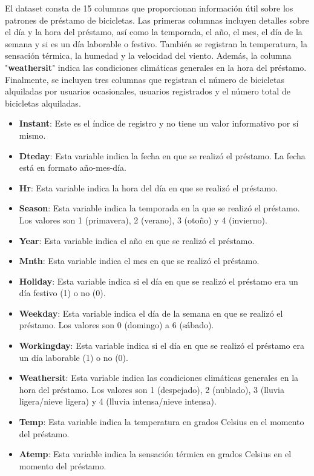 \documentclass{wsdcr}
\begin{document}
El dataset consta de 15 columnas que proporcionan información útil sobre los patrones de préstamo de bicicletas. Las primeras columnas incluyen detalles sobre el día y la hora del préstamo, así como la temporada, el año, el mes, el día de la semana y si es un día laborable o festivo. También se registran la temperatura, la sensación térmica, la humedad y la velocidad del viento. Además, la columna "\textbf{weathersit}" indica las condiciones climáticas generales en la hora del préstamo. Finalmente, se incluyen tres columnas que registran el número de bicicletas alquiladas por usuarios ocasionales, usuarios registrados y el número total de bicicletas alquiladas.
\begin{itemize}
    \item \textbf{Instant}: Este es el índice de registro y no tiene un valor informativo por sí mismo.
    \item \textbf{Dteday}: Esta variable indica la fecha en que se realizó el préstamo. La fecha está en formato año-mes-día.
    \item \textbf{Hr}: Esta variable indica la hora del día en que se realizó el préstamo.
    \item \textbf{Season}: Esta variable indica la temporada en la que se realizó el préstamo. Los valores son 1 (primavera), 2 (verano), 3 (otoño) y 4 (invierno).
    \item \textbf{Year}: Esta variable indica el año en que se realizó el préstamo.
    \item \textbf{Mnth}: Esta variable indica el mes en que se realizó el préstamo.
    \item \textbf{Holiday}: Esta variable indica si el día en que se realizó el préstamo era un día festivo (1) o no (0).
    \item \textbf{Weekday}: Esta variable indica el día de la semana en que se realizó el préstamo. Los valores son 0 (domingo) a 6 (sábado).
    \item \textbf{Workingday}: Esta variable indica si el día en que se realizó el préstamo era un día laborable (1) o no (0).
    \item \textbf{Weathersit}: Esta variable indica las condiciones climáticas generales en la hora del préstamo. Los valores son 1 (despejado), 2 (nublado), 3 (lluvia ligera/nieve ligera) y 4 (lluvia intensa/nieve intensa).
    \item \textbf{Temp}: Esta variable indica la temperatura en grados Celsius en el momento del préstamo.
    \item \textbf{Atemp}: Esta variable indica la sensación térmica en grados Celsius en el momento del préstamo.

\end{itemize}
\end{document}
